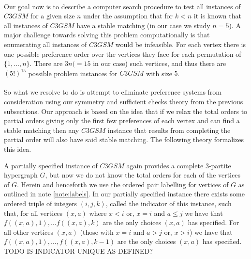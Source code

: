 \paragraph{}
Our goal now is to describe a computer search procedure to test all instances of $C3GSM$ for a given size $n$ under the assumption that for $k<n$ it is known that all instances of $C3GSM$ have a stable matching (in our case we study $n=5$). A major challenge towards solving this problem computationally is that enumerating all instances of $C3GSM$ would be infeasible. For each vertex there is one possible preference order over the vertices they face for each permutation of $\{1,\dots,n\}$. There are $3n (=15$ in our case) such vertices, and thus there are $(5!)^{15}$ possible problem instances for $C3GSM$ with size $5$. 
\paragraph{}
So what we resolve to do is attempt to eliminate preference systems from consideration using our symmetry and sufficient checks theory from the previous subsections. Our approach is based on the idea that if we relax the total orders to partial orders giving only the first few preferences of each vertex and can find a stable matching then any $C3GSM$ instance that results from completing the partial order will also have said stable matching. The following theory formalizes this idea.
\begin{definition}
A partially specified instance of $C3GSM$ again provides a complete $3$-partite hypergraph $G$, but now we do not know the total orders for each of the vertices of $G$. Herein and henceforth we use the ordered pair labelling for vertices of $G$ as outlined in note \ref{note:labels}. In our partially specified instance there exists some ordered triple of integers $(i,j,k)$, called the indicator of this instance, such that, for all vertices $(x,a)$ where $x<i$ or, $x=i$ and $a\leq j$ we have that $f((x,a), 1), \dots f((x,a), k)$ are the only choices $(x,a)$ has specified. For all other vertices $(x,a)$ (those with $x=i$ and $a > j$ or, $x>i$) we have that $f((x,a), 1), \dots, f((x,a),k-1)$ are the only choices $(x,a)$ has specified. TODO-IS-INDICATOR-UNIQUE-AS-DEFINED?
\end{definition}
